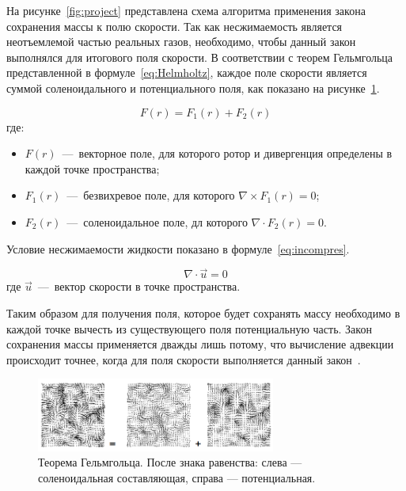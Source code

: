 На рисунке~\ref{fig:project} представлена схема алгоритма применения закона сохранения массы к полю скорости. Так как несжимаемость является неотъемлемой частью реальных газов, необходимо, чтобы данный закон выполнялся для итогового поля скорости. В соответствии с теорем Гельмгольца представленной в формуле~\ref{eq:Helmholtz}, каждое поле скорости является суммой соленоидального и потенциального поля, как показано на рисунке~\ref{fig:hodge}. 

\begin{equation}
	\label{eq:Helmholtz}
	F(r) = F_1(r)+F_2(r)
\end{equation}
где:
\begin{itemize}
	\item $F(r)$~---~векторное поле, для которого ротор и дивергенция определены в каждой точке пространства;
	\item $F_1(r)$~---~безвихревое поле, для которого $\nabla \times F_1(r) =0$;
	\item $F_2(r)$~---~соленоидальное поле, дл которого $\nabla \cdot F_2(r)=0$.
\end{itemize}

Условие несжимаемости жидкости показано в формуле~\ref{eq:incompres}.

\begin{equation}
	\label{eq:incompres}
	\nabla \cdot \vec{u} = 0
\end{equation}
где $\vec{u}$~---~вектор скорости в точке пространства.

Таким образом для получения поля, которое будет сохранять массу необходимо в каждой точке вычесть из существующего поля потенциальную часть. Закон сохранения массы применяется дважды лишь потому, что вычисление адвекции происходит точнее, когда для поля скорости выполняется данный закон~\cite{stam}.

\begin{figure}[H]
	\centering
	\includegraphics[width=0.7\textwidth,page=1]{assets/img/hodge.png}
	\caption{Теорема Гельмгольца. После знака равенства: слева --- соленоидальная составляющая, справа --- потенциальная.}
	\label{fig:hodge}
\end{figure}

